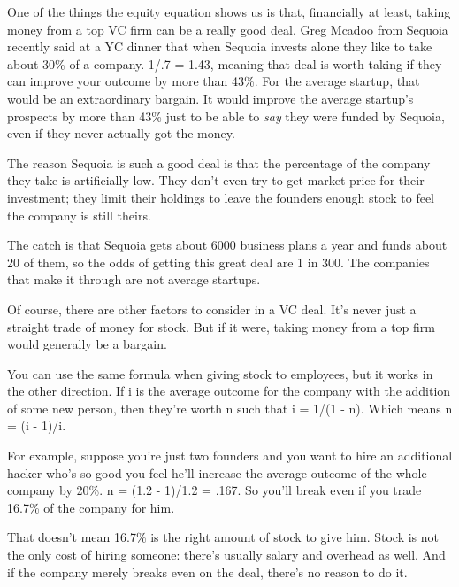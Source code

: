 One of the things the equity equation shows us is
                  that, financially at least, taking money from a top VC firm
                  can be a really good deal. Greg Mcadoo from Sequoia recently
                  said at a YC dinner that when Sequoia invests alone they like
                  to take about 30\% of a company. 1/.7 = 1.43, meaning that deal
                  is worth taking if they can improve your outcome by more than
                  43\%. For the average startup, that would be an extraordinary
                  bargain. It would improve the average startup's prospects by
                  more than 43\% just to be able to \emph{say} they were funded
                  by Sequoia, even if they never actually got the money.

The
                  reason Sequoia is such a good deal is that the percentage of
                  the company they take is artificially low. They don't even try
                  to get market price for their investment; they limit their
                  holdings to leave the founders enough stock to feel the
                  company is still theirs.

The catch is that Sequoia
                  gets about 6000 business plans a year and funds about 20 of
                  them, so the odds of getting this great deal are 1 in 300. The
                  companies that make it through are not average startups.

Of
                  course, there are other factors to consider in a VC deal. It's
                  never just a straight trade of money for stock. But if it
                  were, taking money from a top firm would generally be a
                  bargain.

You can use the same formula when giving
                  stock to employees, but it works in the other direction. If i
                  is the average outcome for the company with the addition of
                  some new person, then they're worth n such that i = 1/(1 - n).
                  Which means n = (i - 1)/i.

For example, suppose
                  you're just two founders and you want to hire an additional
                  hacker who's so good you feel he'll increase the average
                  outcome of the whole company by 20\%. n = (1.2 - 1)/1.2 = .167.
                  So you'll break even if you trade 16.7\% of the company for
                  him.

That doesn't mean 16.7\% is the right amount of
                  stock to give him. Stock is not the only cost of hiring
                  someone: there's usually salary and overhead as well. And if
                  the company merely breaks even on the deal, there's no reason
                  to do it.

